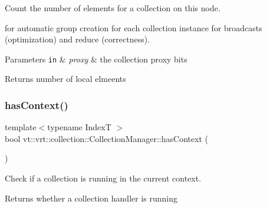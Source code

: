 Count the number of elements for a collection on this node. 

for automatic group creation for each collection instance for broadcasts (optimization) and reduce (correctness).


\begin{DoxyParams}[1]{Parameters}
\mbox{\tt in}  & {\em proxy} & the collection proxy bits\\
\hline
\end{DoxyParams}
\begin{DoxyReturn}{Returns}
number of local elmeents 
\end{DoxyReturn}
\mbox{\label{structvt_1_1vrt_1_1collection_1_1_collection_manager_ad94808d98e429e50376a9d1b35de57ee}} 
\subsubsection{\texorpdfstring{has\+Context()}{hasContext()}}
{\footnotesize\ttfamily template$<$typename IndexT $>$ \\
bool vt\+::vrt\+::collection\+::\+Collection\+Manager\+::has\+Context (\begin{DoxyParamCaption}{ }\end{DoxyParamCaption})\hspace{0.3cm}{\ttfamily [static]}}



Check if a collection is running in the current context. 

\begin{DoxyReturn}{Returns}
whether a collection handler is running 
\end{DoxyReturn}
\mbox{\label{structvt_1_1vrt_1_1collection_1_1_collection_manager_a79d8ce89b21670fe0d482646aca4a2a4}} 
